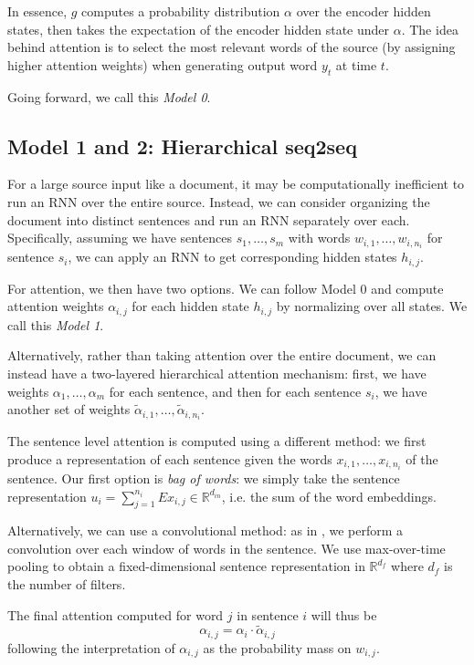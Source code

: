 \documentclass[11pt]{article}
\begin{document}
In essence, $g$ computes a probability distribution $\alpha$ over the encoder hidden states, then takes the expectation of the encoder hidden state under $\alpha$. The idea behind attention is to select the most relevant words of the source (by assigning higher attention weights) when generating output word $y_t$ at time $t$.

Going forward, we call this \emph{Model 0}.

\subsection{Model 1 and 2: Hierarchical seq2seq}

For a large source input like a document, it may be computationally inefficient to run an RNN over the entire source. Instead, we can consider organizing the document into distinct sentences and run an RNN separately over each. Specifically, assuming we have sentences $s_1, \ldots, s_m$ with words $w_{i,1}, \ldots, w_{i,n_i}$ for sentence $s_i$, we can apply an RNN to get corresponding hidden states $h_{i,j}$.

For attention, we then have two options. We can follow Model 0 and compute attention weights $\alpha_{i,j}$ for each hidden state $h_{i,j}$ by normalizing over all states. We call this \emph{Model 1}.

Alternatively, rather than taking attention over the entire document, we can instead have a two-layered hierarchical attention mechanism: first, we have weights $\alpha_1, \ldots, \alpha_m$ for each sentence, and then for each sentence $s_i$, we have another set of weights $\widetilde{\alpha}_{i,1}, \ldots, \widetilde{\alpha}_{i,n_i}$.

The sentence level attention is computed using a different method: we first produce a representation of each sentence given the words $x_{i,1}, \ldots, x_{i, n_i}$ of the sentence. Our first option is \emph{bag of words}: we simply take the sentence representation $u_i = \sum_{j=1}^{n_i} Ex_{i,j} \in \mathbb{R}^{d_{in}}$, i.e. the sum of the word embeddings.

Alternatively, we can use a convolutional method: as in \cite{kim2014convolutional}, we perform a convolution over each window of words in the sentence. We use max-over-time pooling to obtain a fixed-dimensional sentence representation in $\mathbb{R}^{d_f}$ where $d_f$ is the number of filters.


The final attention computed for word $j$ in sentence $i$ will thus be
$$\alpha_{i,j} = \alpha_i \cdot \widetilde{\alpha}_{i,j}$$
following the interpretation of $\alpha_{i,j}$ as the probability mass on $w_{i,j}$.
\end{document}
